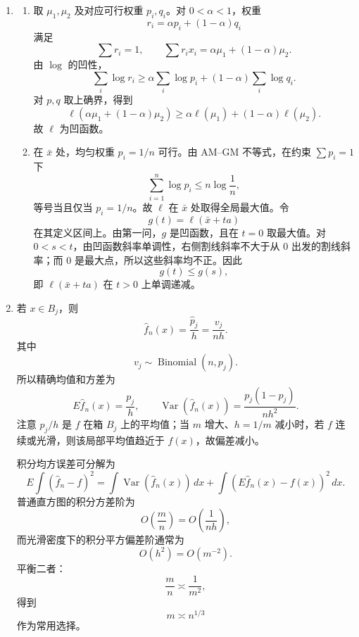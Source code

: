\documentclass[UTF8,12pt]{ctexart}
\begin{document}
\begin{enumerate}[label=\textbf{\arabic*.},leftmargin=2.2em]
\item
\begin{enumerate}[label=\textbf{(\alph*)},leftmargin=2.4em]
\item 取 \(\mu_1,\mu_2\) 及对应可行权重 \(p_i,q_i\)。对 \(0<\alpha<1\)，权重
\[
r_i=\alpha p_i+(1-\alpha)q_i
\]
满足
\[
\sum r_i=1,\qquad \sum r_i x_i=\alpha\mu_1+(1-\alpha)\mu_2.
\]
由 \(\log\) 的凹性，
\[
\sum_i\log r_i
\ge \alpha\sum_i\log p_i+(1-\alpha)\sum_i\log q_i.
\]
对 \(p,q\) 取上确界，得到
\[
\ell(\alpha\mu_1+(1-\alpha)\mu_2)
\ge \alpha\ell(\mu_1)+(1-\alpha)\ell(\mu_2).
\]
故 \(\ell\) 为凹函数。
\item 在 \(\bar x\) 处，均匀权重 \(p_i=1/n\) 可行。由 AM--GM 不等式，在约束 \(\sum p_i=1\) 下
\[
\sum_{i=1}^n\log p_i\le n\log\frac1n,
\]
等号当且仅当 \(p_i=1/n\)。故 \(\ell\) 在 \(\bar x\) 处取得全局最大值。令
\[
g(t)=\ell(\bar x+ta)
\]
在其定义区间上。由第一问，\(g\) 是凹函数，且在 \(t=0\) 取最大值。对 \(0<s<t\)，由凹函数斜率单调性，右侧割线斜率不大于从 \(0\) 出发的割线斜率；而 \(0\) 是最大点，所以这些斜率均不正。因此
\[
g(t)\le g(s),
\]
即 \(\ell(\bar x+ta)\) 在 \(t>0\) 上单调递减。
\end{enumerate}

\item 若 \(x\in B_j\)，则
\[
\widehat f_n(x)=\frac{\widehat p_j}{h}=\frac{v_j}{nh}.
\]
其中
\[
v_j\sim \operatorname{Binomial}(n,p_j).
\]
所以精确均值和方差为
\[
E\widehat f_n(x)=\frac{p_j}{h},
\qquad
\operatorname{Var}(\widehat f_n(x))
=\frac{p_j(1-p_j)}{nh^2}.
\]
注意 \(p_j/h\) 是 \(f\) 在箱 \(B_j\) 上的平均值；当 \(m\) 增大、\(h=1/m\) 减小时，若 \(f\) 连续或光滑，则该局部平均值趋近于 \(f(x)\)，故偏差减小。

积分均方误差可分解为
\[
E\int(\widehat f_n-f)^2
=\int \operatorname{Var}(\widehat f_n(x))\,dx
+\int (E\widehat f_n(x)-f(x))^2\,dx.
\]
普通直方图的积分方差阶为
\[
O\left(\frac{m}{n}\right)=O\left(\frac1{nh}\right),
\]
而光滑密度下的积分平方偏差阶通常为
\[
O(h^2)=O(m^{-2}).
\]
平衡二者：
\[
\frac{m}{n}\asymp \frac1{m^2},
\]
得到
\[
m\asymp n^{1/3}
\]
作为常用选择。


\end{enumerate}
\end{document}
